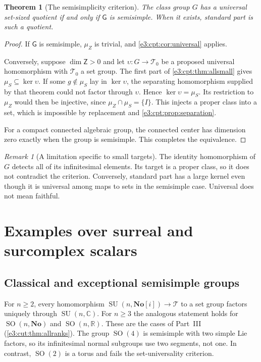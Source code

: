 \documentclass[11pt,letterpaper]{article}
\numberwithin{equation}{section}
\newtheorem{theorem}{Theorem}[section]
\theoremstyle{definition}
\theoremstyle{remark}
\newtheorem{remark}[remark]{Remark}
\newcommand{\No}{\mathbf{No}}
\newcommand{\R}{\mathbb R}
\newcommand{\C}{\mathbb C}
\newcommand{\SO}{\operatorname{SO}}
\newcommand{\SU}{\operatorname{SU}}
\newcommand{\sG}{\mathsf G}
\newcommand{\sZ}{\mathsf Z}
\begin{document}
\begin{theorem}[The semisimplicity criterion]\label{e3:cpt:thm:criterion}
The class group $G$ has a universal set-sized quotient if and only if $\sG$ is
semisimple. When it exists, standard part is such a quotient.
\end{theorem}
\begin{proof}
If $\sG$ is semisimple, $\mu_Z$ is trivial, and \cref{e3:cpt:cor:universal}
applies.

Conversely, suppose $\dim\sZ>0$ and let $\upsilon:G\to\mathcal T_0$ be a
proposed universal homomorphism with $\mathcal T_0$ a set group. The first part
of \cref{e3:cpt:thm:allsmall} gives $\mu_S\subseteq\ker\upsilon$. If some
$g\notin\mu_S$ lay in $\ker\upsilon$, the separating homomorphism supplied by
that theorem could not factor through $\upsilon$. Hence $\ker\upsilon=\mu_S$.
Its restriction to $\mu_Z$ would then be injective, since
$\mu_Z\cap\mu_S=\{I\}$. This injects a proper class into a set, which is
impossible by replacement and \cref{e3:cpt:prop:separation}.

For a compact connected algebraic group, the connected center has dimension
zero exactly when the group is semisimple. This completes the equivalence.
\end{proof}

\begin{remark}[A limitation specific to small targets]\label{e3:cpt:rem:faithful}
The identity homomorphism of $G$ detects all of its infinitesimal elements. Its
target is a proper class, so it does not contradict the criterion. Conversely,
standard part has a large kernel even though it is universal among maps to sets
in the semisimple case. Universal does not mean faithful.
\end{remark}

\section{Examples over surreal and surcomplex scalars}\label{e3:cpt:sec:examples}

\subsection{Classical and exceptional semisimple groups}

For $n\ge2$, every homomorphism $\SU(n,\No[i])\to\mathcal T$ to a set group
factors uniquely through $\SU(n,\C)$. For $n\ge3$ the analogous statement holds
for $\SO(n,\No)$ and $\SO(n,\R)$. These are the cases of Part~III
(\cref{e3:cut:thm:allranks}). The group $\SO(4)$ is semisimple with two simple
Lie factors, so its infinitesimal normal subgroups use two segments, not one. In
contrast, $\SO(2)$ is a torus and fails the set-universality criterion.
\end{document}
